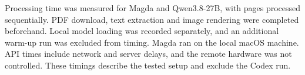 Processing time was measured for Magda and Qwen3.8-27B, with pages processed sequentially. PDF download, text extraction and image rendering were completed beforehand. Local model loading was recorded separately, and an additional warm-up run was excluded from timing. Magda ran on the local macOS machine. API times include network and server delays, and the remote hardware was not controlled. These timings describe the tested setup and exclude the Codex run.

